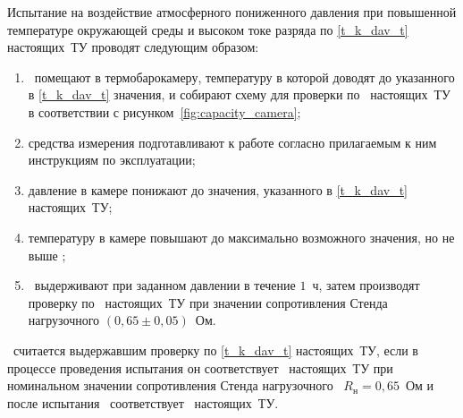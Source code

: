 Испытание на воздействие атмосферного пониженного давления при повышенной температуре окружающей среды и высоком токе разряда по \ref{t_k_dav_t} настоящих~ТУ проводят следующим образом:

\begin{enumerate}
	\item \dut \ помещают в термобарокамеру, температуру в которой доводят до указанного в \ref{t_k_dav_t} значения, и собирают схему для проверки по \treb \ настоящих~ТУ в соответствии с рисунком~\ref{fig:capacity_camera};
	\item средства измерения подготавливают к работе согласно прилагаемым к ним инструкциям по эксплуатации;
	\item давление в камере понижают до значения, указанного в \ref{t_k_dav_t} настоящих~ТУ;
	\item температуру в камере повышают до максимально возможного значения, но не выше \kpshort; 
	\item \dut \ выдерживают при заданном давлении в течение $1$~ч, затем производят проверку по \treb \ настоящих~ТУ при значении сопротивления Стенда нагрузочного \hyperref[e:stend]{\stendRN} $(0,65 \pm 0,05)$~Ом.
\end{enumerate}

\dut \ считается выдержавшим проверку по \ref{t_k_dav_t} настоящих~ТУ, если в процессе проведения испытания он соответствует \treb \ настоящих~ТУ при номинальном значении сопротивления Стенда нагрузочного \hyperref[e:stend]{\stendRN} \ $R_\text{н} = 0,65$~Ом и после испытания \dut \ соответствует \trebafter \ настоящих~ТУ.